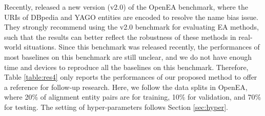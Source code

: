 \documentclass[11pt]{article}
\begin{document}
Recently, \citet{DBLP:journals/pvldb/SunZHWCAL20} \url{} released a new version (v2.0) of the OpenEA benchmark, where the URIs of DBpedia and YAGO entities are encoded to resolve the name bias issue.
They strongly recommend using the v2.0 benchmark for evaluating EA methods, such that the results can better reflect the robustness of these methods in real-world situations.
Since this benchmark was released recently, the performances of most baselines on this benchmark are still unclear, and we do not have enough time and devices to reproduce all the baselines on this benchmark.
Therefore, Table \ref{table:res4} only reports the performances of our proposed method to offer a reference for follow-up research.
Here, we follow the data splits in OpenEA, where 20\% of alignment entity pairs are for training, 10\% for validation, and 70\% for testing.
The setting of hyper-parameters follows Section \ref{sec:hyper}.
\end{document}
